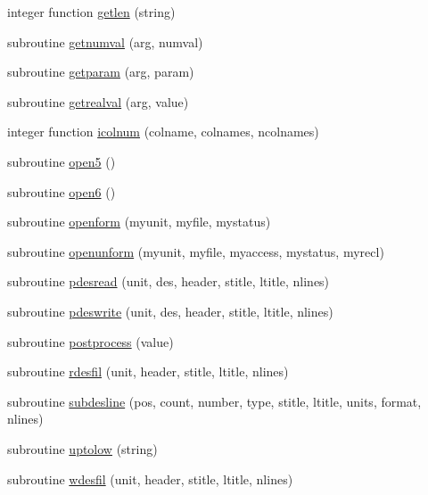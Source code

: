 \begin{DoxyCompactItemize}
\item 
integer function \hyperlink{pipelibfort__gfortran_8f_a275fead53d8835197d08cc4cc8adb752}{getlen} (string)
\item 
subroutine \hyperlink{pipelibfort__gfortran_8f_a45ad46cc0b60db26b8d4b7de85339138}{getnumval} (arg, numval)
\item 
subroutine \hyperlink{pipelibfort__gfortran_8f_a0efa42379f68585938b1d5ba0aaa3512}{getparam} (arg, param)
\item 
subroutine \hyperlink{pipelibfort__gfortran_8f_aef060947b738b74ec1a20e9e10d9914a}{getrealval} (arg, value)
\item 
integer function \hyperlink{pipelibfort__gfortran_8f_ab54da8d38cd228aaf9d7e99b5b54874e}{icolnum} (colname, colnames, ncolnames)
\item 
subroutine \hyperlink{pipelibfort__gfortran_8f_a5c737d3c291fd9b2f044fd1846be82a5}{open5} ()
\item 
subroutine \hyperlink{pipelibfort__gfortran_8f_a9d901279aff8d349ac9c4aa4a7a21237}{open6} ()
\item 
subroutine \hyperlink{pipelibfort__gfortran_8f_ae7b933ee92ff930ccca2af1f19b4e2d6}{openform} (myunit, myfile, mystatus)
\item 
subroutine \hyperlink{pipelibfort__gfortran_8f_a4a3a96633fe9c2da447872dcf96c8add}{openunform} (myunit, myfile, myaccess, mystatus, myrecl)
\item 
subroutine \hyperlink{pipelibfort__gfortran_8f_a1eca3ee376e5a7bd97f524c887db8c8d}{pdesread} (unit, des, header, stitle, ltitle, nlines)
\item 
subroutine \hyperlink{pipelibfort__gfortran_8f_aaae06328c5bf55b850e70d772c565f66}{pdeswrite} (unit, des, header, stitle, ltitle, nlines)
\item 
subroutine \hyperlink{pipelibfort__gfortran_8f_ac0fb3fe597c7b440fe8c68571c30eb2b}{postprocess} (value)
\item 
subroutine \hyperlink{pipelibfort__gfortran_8f_a2becb1505bcb9eae70d47254ab85ef05}{rdesfil} (unit, header, stitle, ltitle, nlines)
\item 
subroutine \hyperlink{pipelibfort__gfortran_8f_adcc6bcf04e48f425b6d1692e04bada68}{subdesline} (pos, count, number, type, stitle, ltitle, units, format, nlines)
\item 
subroutine \hyperlink{pipelibfort__gfortran_8f_ab652d28b0aba6acee788a8b67161570d}{uptolow} (string)
\item 
subroutine \hyperlink{pipelibfort__gfortran_8f_a69b264a7ce1eef222643464103ff8a72}{wdesfil} (unit, header, stitle, ltitle, nlines)
\end{DoxyCompactItemize}



